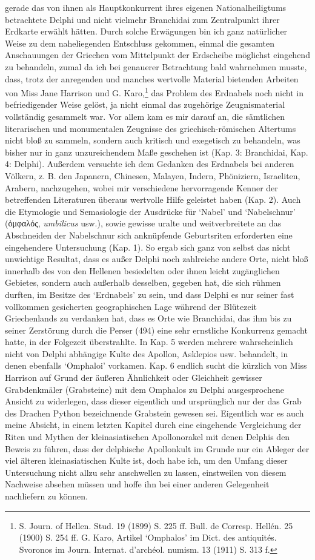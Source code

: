 \documentclass[a4paper, 11pt, oneside]{article}
\begin{document}
gerade das von ihnen als Hauptkonkurrent ihres eigenen Nationalheiligtums betrachtete Delphi und nicht vielmehr Branchidai zum Zentralpunkt ihrer Erdkarte erwählt hätten. Durch solche Erwägungen bin ich ganz natürlicher Weise zu dem naheliegenden Entschluss gekommen, einmal die gesamten Anschauungen der Griechen vom Mittelpunkt der Erdscheibe möglichst eingehend zu behandeln, zumal da ich bei genauerer Betrachtung bald wahrnehmen musste, dass, trotz der anregenden und manches wertvolle Material bietenden Arbeiten von Miss Jane Harrison und G. Karo,\footnote{S. Journ. of Hellen. Stud. 19 (1899) S. 225 ff. Bull. de Corresp. Hellén. 25 (1900) S. 254 ff. G. Karo, Artikel `Omphalos' im Dict. des antiquités. Svoronos im Journ. Internat. d'archéol. numism. 13 (1911) S. 313 f.} das Problem des Erdnabels noch nicht in befriedigender Weise gelöst, ja nicht einmal das zugehörige Zeugnismaterial vollständig gesammelt war. Vor allem kam es mir darauf an, die sämtlichen literarischen und monumentalen Zeugnisse des griechisch-römischen Altertums nicht bloß zu sammeln, sondern auch kritisch und exegetisch zu behandeln, was bisher nur in ganz unzureichendem Maße geschehen ist (Kap. 3: Branchidai, Kap. 4: Delphi). Außerdem versuchte ich dem Gedanken des Erdnabels bei anderen Völkern, z. B. den Japanern, Chinesen, Malayen, Indern, Phöniziern, Israeliten, Arabern, nachzugehen, wobei mir verschiedene hervorragende Kenner der betreffenden Literaturen überaus wertvolle Hilfe geleistet haben (Kap. 2). Auch die Etymologie und Semasiologie der Ausdrücke für `Nabel' und `Nabelschnur' (ὀμφαλός, \emph{umbilicus} usw.), sowie gewisse uralte und weitverbreitete an das Abschneiden der Nabelschnur sich anknüpfende Geburtsriten erforderten eine eingehendere Untersuchung (Kap. 1). So ergab sich ganz von selbst das nicht unwichtige Resultat, dass es außer Delphi noch zahlreiche andere Orte, nicht bloß innerhalb des von den Hellenen besiedelten oder ihnen leicht zugänglichen Gebietes, sondern auch außerhalb desselben, gegeben hat, die sich rühmen durften, im Besitze des `Erdnabels' zu sein, und dass Delphi es nur seiner fast vollkommen gesicherten geographischen Lage während der Blütezeit Griechenlands zu verdanken hat, dass es Orte wie Branchidai, das ihm bis zu seiner Zerstörung durch die Perser (494) eine sehr ernstliche Konkurrenz gemacht hatte, in der Folgezeit überstrahlte. In Kap. 5 werden mehrere wahrscheinlich nicht von Delphi abhängige Kulte des Apollon, Asklepios usw. behandelt, in denen ebenfalls `Omphaloi' vorkamen. Kap. 6 endlich sucht die kürzlich von Miss Harrison auf Grund der äußeren Ähnlichkeit oder Gleichheit gewisser Grabdenkmäler (Grabsteine) mit dem Omphalos zu Delphi ausgesprochene Ansicht zu widerlegen, dass dieser eigentlich und ursprünglich nur der das Grab des Drachen Python bezeichnende Grabstein gewesen sei. Eigentlich war es auch meine Absicht, in einem letzten Kapitel durch eine eingehende Vergleichung der Riten und Mythen der kleinasiatischen Apollonorakel mit denen Delphis den Beweis zu führen, dass der delphische Apollonkult im Grunde nur ein Ableger der viel älteren kleinasiatischen Kulte ist, doch habe ich, um den Umfang dieser Untersuchung nicht allzu sehr anschwellen zu lassen, einstweilen von diesem Nachweise absehen müssen und hoffe ihn bei einer anderen Gelegenheit nachliefern zu können.
\end{document}
